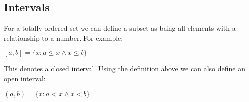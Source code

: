 
\subsection{Intervals}

For a totally ordered set we can define a subset as being all elements with a relationship to a number. For example:

$[a,b]=\{x:a\le x \land x\le b\}$

This denotes a closed interval. Using the definition above we can also define an open interval:

$(a,b)=\{x:a< x \land x< b\}$


